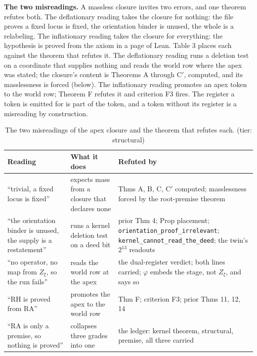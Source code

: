 \documentclass[10pt,twocolumn]{article}
\begin{document}
\textbf{The two misreadings.} A massless closure invites two errors, and
one theorem refutes both. The deflationary reading takes the closure for
nothing: the file proves a fixed locus is fixed, the orientation binder
is unused, the whole is a relabeling. The inflationary reading takes the
closure for everything: the hypothesis is proved from the axiom in a
page of Lean. Table 3 places each against the theorem that refutes it.
The deflationary reading runs a deletion test on a coordinate that
supplies nothing and reads the world row where the apex was stated; the
closure's content is Theorems A through C\('\), computed, and its
masslessness is forced (below). The inflationary reading promotes an
apex token to the world row; Theorem F refutes it and criterion F3
fires. The register a token is emitted for is part of the token, and a
token without its register is a misreading by construction.

\begin{table}[t]
\footnotesize
\caption{The two misreadings of the apex closure and the theorem that refutes each. (tier: structural)}
\begin{tabular}{@{}p{}p{}p{}@{}}
\toprule
Reading & What it does & Refuted by \\
\midrule
“trivial, a fixed locus is fixed” & expects mass from a closure that declares none & Thms A, B, C, C$'$ computed; masslessness forced by the root-premise theorem \\
“the orientation binder is unused, the supply is a restatement” & runs a kernel deletion test on a deed bit & prior Thm 4; Prop placement; \texttt{orientation\_\allowbreak}\allowbreak\texttt{proof\_\allowbreak irrelevant}; \texttt{kernel\_\allowbreak cannot\_\allowbreak}\allowbreak\texttt{read\_\allowbreak the\_\allowbreak deed}; the twin's $2^{13}$ readouts \\
“no operator, no map from $Z_\xi$, so the run fails” & reads the world row at the apex & the dual-register verdict; both lines carried; $\varphi$ embeds the stage, not $Z_\xi$, and says so \\
“RH is proved from RA” & promotes the apex to the world row & Thm F; criterion F3; prior Thms 11, 12, 14 \\
“RA is only a premise, so nothing is proved” & collapses three grades into one & the ledger: kernel theorem, structural, premise, all three carried \\
\bottomrule
\end{tabular}
\end{table}
\end{document}

